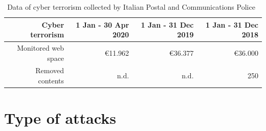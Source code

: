 \documentclass{easychair}
\begin{document}
\begin{table}[h]
  \begin{center}
	\begin{tabular}{|r|r|r|r|}									
		\hline									
		Cyber terrorism	&	1 Jan - 30 Apr 2020	&	1 Jan - 31 Dec 2019	&	1 Jan - 31 Dec 2018\\
		\hline									
		Monitored web space	&	\euro 11.962	&	\euro 36.377	&	\euro 36.000\\
		Removed contents 	&	n.d.	&	n.d.	&	250\\
		\hline	
	\end{tabular}
        \end{center}
	\caption{Data of cyber terrorism collected by Italian Postal and Communications Police~\cite{oad20}}									
	\label{tab:table3}									
\end{table}	

\section{Type of attacks}\label{sec:TypeAttacks}
\end{document}
